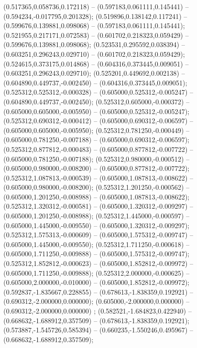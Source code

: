  (0.517365,0.058736,0.172118) -- (0.597183,0.061111,0.145441) -- (0.594234,-0.017795,0.201328);
 (0.519896,0.138142,0.117241) -- (0.599676,0.139881,0.098068) -- (0.597183,0.061111,0.145441);
 (0.521955,0.217171,0.072583) -- (0.601702,0.218323,0.059429) -- (0.599676,0.139881,0.098068);
 (0.523531,0.295592,0.038394) -- (0.603251,0.296243,0.029710) -- (0.601702,0.218323,0.059429);
 (0.524615,0.373175,0.014868) -- (0.604316,0.373445,0.009051) -- (0.603251,0.296243,0.029710);
 (0.525201,0.449692,0.002138) -- (0.604890,0.449737,-0.002450) -- (0.604316,0.373445,0.009051);
 (0.525312,0.525312,-0.000328) -- (0.605000,0.525312,-0.005247) -- (0.604890,0.449737,-0.002450);
 (0.525312,0.605000,-0.000372) -- (0.605000,0.605000,-0.005950) -- (0.605000,0.525312,-0.005247);
 (0.525312,0.690312,-0.000412) -- (0.605000,0.690312,-0.006597) -- (0.605000,0.605000,-0.005950);
 (0.525312,0.781250,-0.000449) -- (0.605000,0.781250,-0.007188) -- (0.605000,0.690312,-0.006597);
 (0.525312,0.877812,-0.000483) -- (0.605000,0.877812,-0.007722) -- (0.605000,0.781250,-0.007188);
 (0.525312,0.980000,-0.000512) -- (0.605000,0.980000,-0.008200) -- (0.605000,0.877812,-0.007722);
 (0.525312,1.087813,-0.000539) -- (0.605000,1.087813,-0.008622) -- (0.605000,0.980000,-0.008200);
 (0.525312,1.201250,-0.000562) -- (0.605000,1.201250,-0.008988) -- (0.605000,1.087813,-0.008622);
 (0.525312,1.320312,-0.000581) -- (0.605000,1.320312,-0.009297) -- (0.605000,1.201250,-0.008988);
 (0.525312,1.445000,-0.000597) -- (0.605000,1.445000,-0.009550) -- (0.605000,1.320312,-0.009297);
 (0.525312,1.575313,-0.000609) -- (0.605000,1.575312,-0.009747) -- (0.605000,1.445000,-0.009550);
 (0.525312,1.711250,-0.000618) -- (0.605000,1.711250,-0.009888) -- (0.605000,1.575312,-0.009747);
 (0.525312,1.852812,-0.000623) -- (0.605000,1.852812,-0.009972) -- (0.605000,1.711250,-0.009888);
 (0.525312,2.000000,-0.000625) -- (0.605000,2.000000,-0.010000) -- (0.605000,1.852812,-0.009972);
 (0.592837,-1.835667,0.228855) -- (0.678613,-1.838359,0.192921) -- (0.690312,-2.000000,0.000000);
 (0.605000,-2.000000,0.000000) -- (0.690312,-2.000000,0.000000) ;
 (0.582521,-1.684823,0.422940) -- (0.668632,-1.688912,0.357509) -- (0.678613,-1.838359,0.192921);
 (0.573887,-1.545726,0.585394) -- (0.660235,-1.550246,0.495967) -- (0.668632,-1.688912,0.357509);
